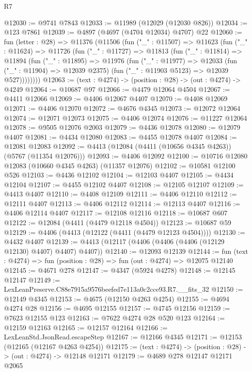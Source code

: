 \begin{lexlean}{R7}
\begin{coremodule}
@12030 := @9741 @7843
@12033 := @11989 (@12029 (@12030 @826))
@12034 := @123 @7861
@12039 := @4897 (@4697 (@4704 @12034) @4707) @22
@12060 := fun (letter : @28) =>
  @11376
    (@11506
      (fun ("_" : @11507) =>
      @11623
        (fun ("_" : @11624) =>
        @11726
          (fun ("_" : @11727) =>
          @11813
            (fun ("_" : @11814) =>
            @11894
              (fun ("_" : @11895) =>
              @11976
                (fun ("_" : @11977) =>
                @12033
                  (fun ("_" : @11904) => @12039 @2375)
                  (fun ("_" : @11903 @5123) => @12039 @527))))))))
@12063 := (text : @4274) -> (position : @28) -> (out : @4274) -> @4249
@12064 := @10687 @97
@12066 := @4479 @12064 @4504
@12067 := @4411 @12066
@12069 := @4406 @12067 @4407
@12070 := @4408 @12069
@12071 := @4406 @12070
@12072 := @4676 @4345
@12073 := @12072 @12064
@12074 := @12071 @12073
@12075 := @4406 @12074
@12076 := @11227 @12064
@12078 := @9505 @12076 @2003
@12079 := @4436 @12078
@12080 := @12079 @4407
@12081 := @4434 @12080
@12083 := @4455 @12078 @4407
@12084 := @12081 @12083
@12092 := @4413 (@12084 (@4411 (@10656 @4345 @4263)) (@5767 (@11354 @12076)))
@12093 := @4406 @12092
@12100 := @10716 @12080 @12083 (@10660 @4345 @4263) (@11357 @12076)
@12102 := @10581 @12100 @526
@12103 := @4436 @12102
@12104 := @12103 @4407
@12105 := @4434 @12104
@12107 := @4455 @12102 @4407
@12108 := @12105 @12107
@12109 := @4413 @4407
@12110 := @4408 @12109
@12111 := @4406 @12110
@12112 := @12111 @4407
@12113 := @4406 @12112
@12114 := @12113 @4407
@12116 := @4406 @12114 @4407
@12117 := @12108 @12116
@12118 := @10687 @607
@12122 := @12084 (@4411 (@4479 @12118 @4504))
@12123 := @10687 @59
@12129 := @4406 (@4413 (@12122 (@4411 (@4479 @12123 @4504))))
@12130 := @4432 @4407
@12139 := @4413 (@12117 (@4406 (@4406 (@4406 (@12129 @12130) @4407) @4407) @4407))
@12140 := @12093 @12139
@12144 := fun (text : @4274) => fun (position : @28) => fun (out : @4274) => @12075 @12140
@12145 := @4671 @278
@12147 := @4347 (@5924 @4278)
@12148 := @12145 @12147
@12149 := LexLeanPreserve.C88e7915a9576beefed7e113a0c2cce93.R7.__fits_32
@12150 := @12149 @4345
@12153 := @4675 (@12150 @4263 @4254)
@12155 := @4694 @4274 @28
@12156 := @4695 @12155
@12157 := @4745 @12156
@12159 := @7623 @12155 @123
@12163 := @7622 @4274 @28 @520 @123
@12164 := @12159 @12163
@12165 := @12157 @12164
@12166 := LexLeanStd.JsonRead.escapeStep
@12167 := @12166 @4345
@12171 := @12153 (@12165 (@12167 @4263 @4254))
@12175 := (text : @4274) -> (position : @28) -> (out : @4274) -> @12148 @12171
@12179 := @4689 @278 @12147 @12171 @2065

\end{coremodule}
\end{lexlean}
